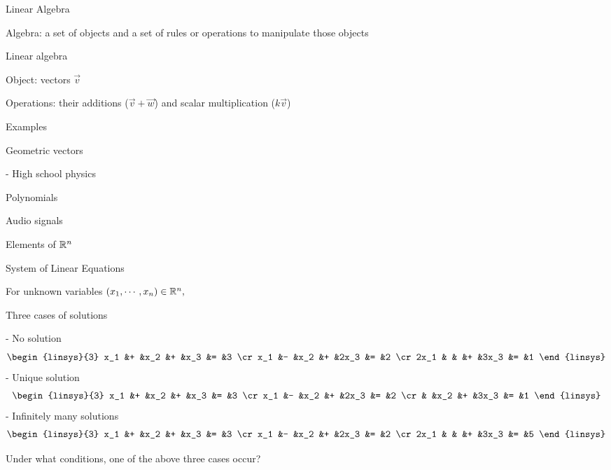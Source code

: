 \documentclass[handout,fleqn,aspectratio=169]{beamer}
\begin{document}
\begin{frame}{Linear Algebra}

\plitemsep 0.1in

\bci 
\item Algebra: a set of objects and a set of rules or operations to manipulate those objects

\item Linear algebra
\plitemsep 0.05in
\bci
\item Object: vectors $\vec{v}$
\item Operations: their additions ($\vec{v} + \vec{w}$) and scalar multiplication ($k\vec{v}$)
\eci

\item Examples

{
\bci
\item Geometric vectors

- High school physics
\item Polynomials
\item Audio signals
\item Elements of ${\mathbb R}^n$
\eci
}
{
\centering
{}
}

\eci
\end{frame}

\begin{frame}{System of Linear Equations}

\plitemsep 0.1in


\bci 
\item For unknown variables $(x_1, \cdots, x_n) \in {\mathbb R}^{n},$

\item Three cases of solutions

{
- No solution
$$
\begin{linsys}{3}
x_1 &+ &x_2 &+ &x_3 &= &3 \cr
x_1 &- &x_2 &+ &2x_3 &= &2 \cr
2x_1 & & &+ &3x_3 &= &1 
\end{linsys}
$$
}
{
- Unique solution
$$
\begin{linsys}{3}
x_1 &+ &x_2 &+ &x_3 &= &3 \cr
x_1 &- &x_2 &+ &2x_3 &= &2 \cr
 & &x_2 &+ &3x_3 &= &1 
\end{linsys}
$$
}
{
- Infinitely many solutions 
$$
\begin{linsys}{3}
x_1 &+ &x_2 &+ &x_3 &= &3 \cr
x_1 &- &x_2 &+ &2x_3 &= &2 \cr
2x_1 & & &+ &3x_3 &= &5 
\end{linsys}
$$
}
\item \question Under what conditions, one of the above three cases occur?
\eci
\end{frame}
\end{document}
